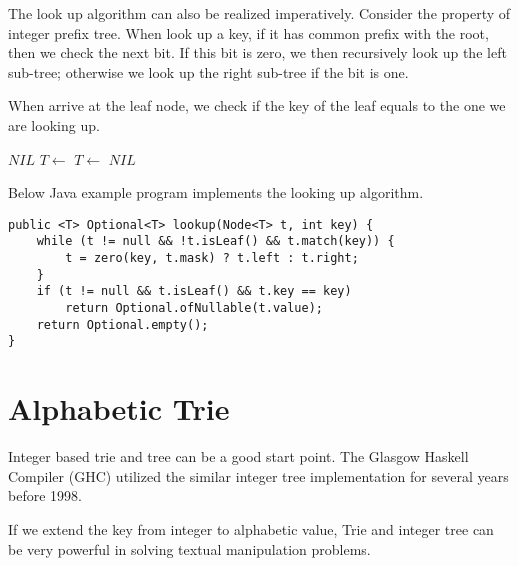 \documentclass{article}
\begin{document}
The look up algorithm can also be realized imperatively.
Consider the property of integer prefix tree. When look up a
key, if it has common prefix with the root,
then we check the next bit. If
this bit is zero, we then recursively look up the left sub-tree;
otherwise we look up the right sub-tree if the bit is one.

When arrive at the leaf node, we check if the key of the
leaf equals to the one we are looking up.

\begin{algorithmic}[1]
    \State \Return $NIL$ 
  \EndIf
      \State $T \gets$ 
    \Else
      \State $T \gets$ 
    \EndIf
  \EndWhile
    \State \Return {}
  \Else
    \State \Return $NIL$ 
  \EndIf
\EndFunction
\end{algorithmic}

Below Java example program implements the looking up algorithm.

\lstset{language=Java}
\begin{lstlisting}
public <T> Optional<T> lookup(Node<T> t, int key) {
    while (t != null && !t.isLeaf() && t.match(key)) {
        t = zero(key, t.mask) ? t.left : t.right;
    }
    if (t != null && t.isLeaf() && t.key == key)
        return Optional.ofNullable(t.value);
    return Optional.empty();
}
\end{lstlisting}


\section{Alphabetic Trie}
Integer based trie and tree can be a good start point. The
Glasgow Haskell Compiler (GHC) utilized the similar integer tree
implementation for several years before 1998\cite{okasaki-int-map}.

If we extend the key from integer to alphabetic
value, Trie and integer tree can be very powerful in solving
textual manipulation problems.

\end{document}
